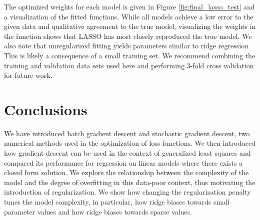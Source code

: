 \documentclass[10pt]{article}
\begin{document}
The optimized weights for each model is given in Figure \ref{fig:final_lasso_test} and a visualization of the fitted functions. While all models achieve a low error to the given data and qualitative agreement to the true model, visualizing the weights in the function shows that LASSO has most closely reproduced the true model. We also note that unregularized fitting yields parameters similar to ridge regression. This is likely a consequence of a small training set. We recommend combining the training and validation data sets used here and performing 3-fold cross validation for future work.


\section{Conclusions}

We have introduced batch gradient descent and stochastic gradient descent, two numerical methods used in the optimization of loss functions. We then introduced how gradient descent can be used in the context of generalized least squares and compared its performance for regression on linear models where there exists a closed form solution. We explore the relationship between the complexity of the model and the degree of overfitting in this data-poor context, thus motivating the introduction of regularization. We show how changing the regularization penalty tunes the model complexity, in particular, how ridge biases towards small parameter values and how ridge biases towards sparse values.

 
\end{document}
